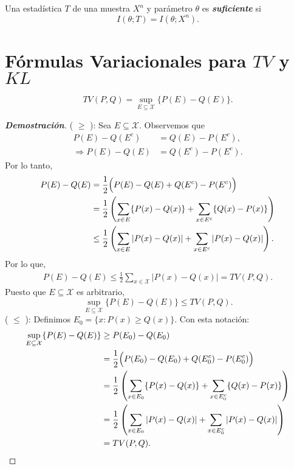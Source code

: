 \begin{definition}
Una estad\'istica $T$ de una muestra $X^n$ y par\'ametro $\theta$ es \textit{\textbf{suficiente}} si 
\begin{equation*}
    I(\theta;T)=I(\theta;X^n).
\end{equation*}
\end{definition}

\section{F\'ormulas Variacionales para $TV$ y $KL$}

\begin{theorem}
\begin{equation*}
    TV(P,Q)=\sup_{E\subseteq\mathcal{X}}\{P(E)-Q(E)\}.
\end{equation*}
\end{theorem}
\begin{proof}[\textbf{Demostraci\'on}]
( $\geq$ ): Sea $E\subseteq\mathcal{X}$. Observemos que
\begin{align*}
    P(E)-Q(E^c)&=Q(E)-P(E^c), \\
    \Longrightarrow P(E)-Q(E)&=Q(E^c)-P(E^c).
\end{align*}
Por lo tanto,
\begin{align*}
    P(E)-Q(E)&=\frac{1}{2}\Bigl(P(E)-Q(E)+Q(E^c)-P(E^c)\Bigl)\\
    &=\frac{1}{2}\left(\sum_{x\in E}\{P(x)-Q(x)\}+\sum_{x\in E^c}\{Q(x)-P(x)\}\right)\\
    &\leq\frac{1}{2}\left(\sum_{x\in E}|P(x)-Q(x)|+\sum_{x\in E^c}|P(x)-Q(x)|\right).
\end{align*}
Por lo que,
\begin{align*}
    P(E)-Q(E)\leq\frac{1}{2}\sum_{x\in\mathcal{X}}|P(x)-Q(x)|=TV(P,Q).
\end{align*}
Puesto que $E\subseteq\mathcal{X}$ es arbitrario,
\begin{equation*}
    \sup_{E\subseteq\mathcal{X}}\{P(E)-Q(E)\}\leq TV(P,Q).
\end{equation*}
\noindent( $\leq$ ): Definimos $E_0=\{x\colon P(x)\geq Q(x)\}$. Con esta notaci\'on:
\begin{align*}
    \sup_{E\subseteq\mathcal{X}}\{P(E)-Q(E)\}&\geq P(E_0)-Q(E_0)\\
    &=\frac{1}{2}\Bigl(P(E_0)-Q(E_0)+Q(E_0^c)-P(E_0^c)\Bigl)\\
    &=\frac{1}{2}\left(\sum_{x\in E_0}\{P(x)-Q(x)\}+\sum_{x\in E_0^c}\{Q(x)-P(x)\}\right)\\
    &=\frac{1}{2}\left(\sum_{x\in E_0}|P(x)-Q(x)|+\sum_{x\in E_0^c}|P(x)-Q(x)|\right)\\
    &=TV(P,Q).
\end{align*}
\end{proof}

